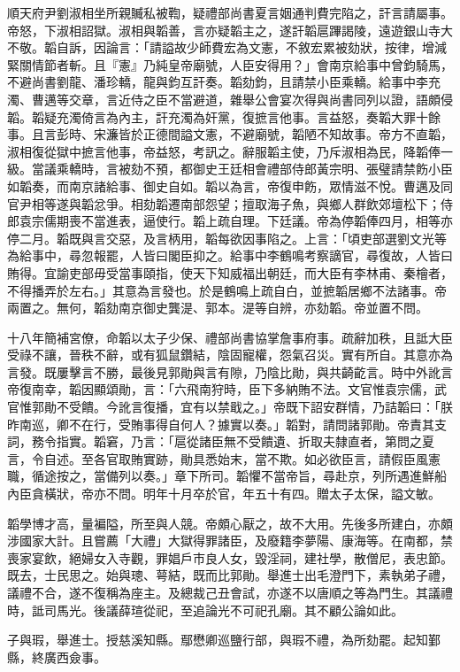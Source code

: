 \begin{pinyinscope}
順天府尹劉淑相坐所親贓私被鞫，疑禮部尚書夏言姻通判費完陷之，訐言請屬事。帝怒，下淑相詔獄。淑相與韜善，言亦疑韜主之，遂訐韜扈蹕謁陵，遠遊銀山寺大不敬。韜自訴，因論言：「請謚故少師費宏為文憲，不敘宏累被劾狀，按律，增減緊關情節者斬。且『憲』乃純皇帝廟號，人臣安得用？」會南京給事中曾鈞騎馬，不避尚書劉龍、潘珍轎，龍與鈞互訐奏。韜劾鈞，且請禁小臣乘轎。給事中李充濁、曹邁等交章，言近侍之臣不當避道，雜舉公會宴次得與尚書同列以證，語頗侵韜。韜疑充濁倚言為內主，訐充濁為奸黨，復摭言他事。言益怒，奏韜大罪十餘事。且言彭時、宋濂皆於正德間謚文憲，不避廟號，韜陋不知故事。帝方不直韜，淑相復從獄中摭言他事，帝益怒，考訊之。辭服韜主使，乃斥淑相為民，降韜俸一級。當議乘轎時，言被劾不預，都御史王廷相會禮部侍郎黃宗明、張璧請禁飭小臣如韜奏，而南京諸給事、御史自如。韜以為言，帝復申飭，眾情滋不悅。曹邁及同官尹相等遂與韜忿爭。相劾韜遷南部怨望；擅取海子魚，與鄉人群飲郊壇松下；侍郎袁宗儒期喪不當進表，逼使行。韜上疏自理。下廷議。帝為停韜俸四月，相等亦停二月。韜既與言交惡，及言柄用，韜每欲因事陷之。上言：「頃吏部選劉文光等為給事中，尋忽報罷，人皆曰閣臣抑之。給事中李鶴鳴考察謫官，尋復故，人皆曰賄得。宜諭吏部毋受當事頤指，使天下知威福出朝廷，而大臣有李林甫、秦檜者，不得播弄於左右。」其意為言發也。於是鶴鳴上疏自白，並摭韜居鄉不法諸事。帝兩置之。無何，韜劾南京御史龔湜、郭本。湜等自辨，亦劾韜。帝並置不問。

十八年簡補宮僚，命韜以太子少保、禮部尚書協掌詹事府事。疏辭加秩，且詆大臣受祿不讓，晉秩不辭，或有狐鼠鑽結，陰固寵權，怨氣召災。實有所自。其意亦為言發。既屢擊言不勝，最後見郭勛與言有隙，乃陰比勛，與共齮齕言。時中外訛言帝復南幸，韜因顯頌勛，言：「六飛南狩時，臣下多納賄不法。文官惟袁宗儒，武官惟郭勛不受饋。今訛言復播，宜有以禁戢之。」帝既下詔安群情，乃詰韜曰：「朕昨南巡，卿不在行，受賄事得自何人？據實以奏。」韜對，請問諸郭勛。帝責其支詞，務令指實。韜窘，乃言：「扈從諸臣無不受饋遺、折取夫隸直者，第問之夏言，令自述。至各官取賄實跡，勛具悉始末，當不欺。如必欲臣言，請假臣風憲職，循途按之，當備列以奏。」章下所司。韜懼不當帝旨，尋赴京，列所遇進鮮船內臣貪橫狀，帝亦不問。明年十月卒於官，年五十有四。贈太子太保，謚文敏。

韜學博才高，量褊隘，所至與人競。帝頗心厭之，故不大用。先後多所建白，亦頗涉國家大計。且嘗薦「大禮」大獄得罪諸臣，及廢籍李夢陽、康海等。在南都，禁喪家宴飲，絕婦女入寺觀，罪娼戶市良人女，毀淫祠，建社學，散僧尼，表忠節。既去，士民思之。始與璁、萼結，既而比郭勛。舉進士出毛澄門下，素執弟子禮，議禮不合，遂不復稱為座主。及總裁己丑會試，亦遂不以唐順之等為門生。其議禮時，詆司馬光。後議薛瑄從祀，至追論光不可祀孔廟。其不顧公論如此。

子與瑕，舉進士。授慈溪知縣。鄢懋卿巡鹽行部，與瑕不禮，為所劾罷。起知鄞縣，終廣西僉事。


\end{pinyinscope}
